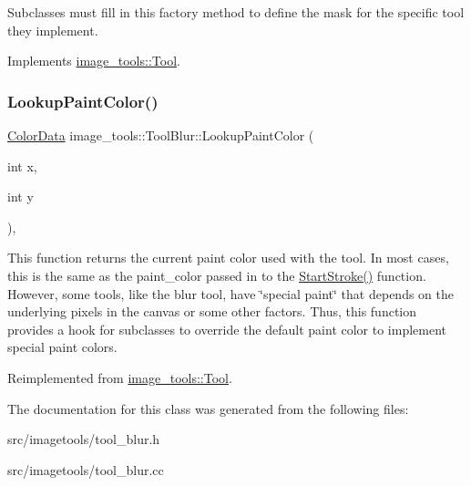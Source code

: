 Subclasses must fill in this factory method to define the mask for the specific tool they implement. 

Implements \hyperlink{classimage__tools_1_1Tool_a7d58325846dbc0467e52221daa1310a7}{image\+\_\+tools\+::\+Tool}.

\mbox{\label{classimage__tools_1_1ToolBlur_af709da063f86da74d878d079fd2aab5e}} 
\subsubsection{\texorpdfstring{Lookup\+Paint\+Color()}{LookupPaintColor()}}
{\footnotesize\ttfamily \hyperlink{classimage__tools_1_1ColorData}{Color\+Data} image\+\_\+tools\+::\+Tool\+Blur\+::\+Lookup\+Paint\+Color (\begin{DoxyParamCaption}\item[{int}]{x,  }\item[{int}]{y }\end{DoxyParamCaption})\hspace{0.3cm}{\ttfamily [override]}, {\ttfamily [virtual]}}

This function returns the current paint color used with the tool. In most cases, this is the same as the paint\+\_\+color passed in to the \hyperlink{classimage__tools_1_1Tool_a1b7cd7d59588923d7e29b6150334f5b8}{Start\+Stroke()} function. However, some tools, like the blur tool, have \char`\"{}special paint\char`\"{} that depends on the underlying pixels in the canvas or some other factors. Thus, this function provides a hook for subclasses to override the default paint color to implement special paint colors. 

Reimplemented from \hyperlink{classimage__tools_1_1Tool_aaf72d26377a6563fe9002e3288933285}{image\+\_\+tools\+::\+Tool}.



The documentation for this class was generated from the following files\+:\begin{DoxyCompactItemize}
\item 
src/imagetools/tool\+\_\+blur.\+h\item 
src/imagetools/tool\+\_\+blur.\+cc\end{DoxyCompactItemize}
